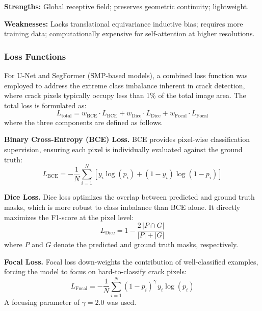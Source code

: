 \textbf{Strengths:} Global receptive field; preserves geometric continuity; lightweight.

\textbf{Weaknesses:} Lacks translational equivariance inductive bias; requires more training data; computationally expensive for self-attention at higher resolutions.

\subsubsection{Loss Functions}

\hs For U-Net and SegFormer (SMP-based models), a combined loss function was employed to address the extreme class imbalance inherent in crack detection, where crack pixels typically occupy less than 1\% of the total image area. The total loss is formulated as:
\begin{equation}
    L_{\text{total}} = w_{\text{BCE}} \cdot L_{\text{BCE}} + w_{\text{Dice}} \cdot L_{\text{Dice}} + w_{\text{Focal}} \cdot L_{\text{Focal}}
\end{equation}
where the three components are defined as follows.

\textbf{Binary Cross-Entropy (BCE) Loss.} BCE provides pixel-wise classification supervision, ensuring each pixel is individually evaluated against the ground truth:
\begin{equation}
    L_{\text{BCE}} = -\frac{1}{N} \sum_{i=1}^{N} \left[ y_i \log(p_i) + (1 - y_i) \log(1 - p_i) \right]
\end{equation}

\textbf{Dice Loss.} Dice loss optimizes the overlap between predicted and ground truth masks, which is more robust to class imbalance than BCE alone. It directly maximizes the F1-score at the pixel level:
\begin{equation}
    L_{\text{Dice}} = 1 - \frac{2 \, |P \cap G|}{|P| + |G|}
\end{equation}
where $P$ and $G$ denote the predicted and ground truth masks, respectively.

\textbf{Focal Loss.} Focal loss \cite{29-lin-2017} down-weights the contribution of well-classified examples, forcing the model to focus on hard-to-classify crack pixels:
\begin{equation}
    L_{\text{Focal}} = -\frac{1}{N} \sum_{i=1}^{N} (1 - p_i)^{\gamma} \, y_i \log(p_i)
\end{equation}
A focusing parameter of $\gamma = 2.0$ was used.

